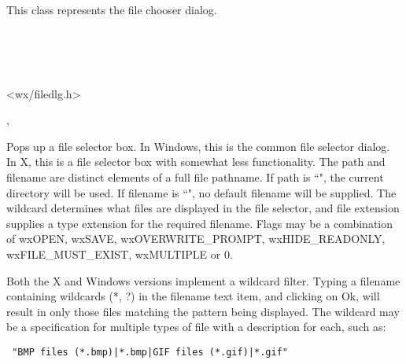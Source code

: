 \section{}\label{wxfiledialog}

This class represents the file chooser dialog.


\\
\\
\\


<wx/filedlg.h>


, 


Pops up a file selector box. In Windows, this is the common file selector
dialog. In X, this is a file selector box with somewhat less functionality.
The path and filename are distinct elements of a full file pathname.
If path is ``", the current directory will be used. If filename is ``",
no default filename will be supplied. The wildcard determines what files
are displayed in the file selector, and file extension supplies a type
extension for the required filename. Flags may be a combination of wxOPEN,
wxSAVE, wxOVERWRITE\_PROMPT, wxHIDE\_READONLY, wxFILE\_MUST\_EXIST, wxMULTIPLE or 0.

Both the X and Windows versions implement a wildcard filter. Typing a
filename containing wildcards (*, ?) in the filename text item, and
clicking on Ok, will result in only those files matching the pattern being
displayed. The wildcard may be a specification for multiple
types of file with a description for each, such as:

\begin{verbatim}
 "BMP files (*.bmp)|*.bmp|GIF files (*.gif)|*.gif"
\end{verbatim}


\label{wxfiledialogconstr}


